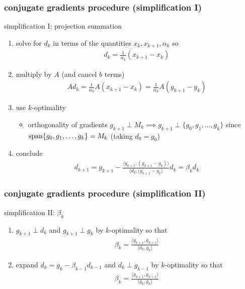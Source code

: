 \documentclass[10pt,dvipsnames*]{beamer}
\begin{document}
\begin{frame}
  \frametitle{conjugate gradients procedure (simplification I)}
  \begin{block}{simplification I: projection summation}
    \begin{enumerate}
      \item \pause solve for $d_k$ in terms of the quantities $x_k, x_{k+1}, \alpha_k$ so
      \begin{align}
        d_k = \frac{1}{\alpha_k} (x_{k+1} - x_k)
      \end{align}
      \item \pause multiply by $A$ (and cancel $b$ terms)
      \begin{align}
        A d_k = \frac{1}{\alpha_k} A (x_{k+1} - x_k) = \frac{1}{\alpha_k} A (g_{k+1} - g_k)
      \end{align}
      \item \pause use $k$-optimality
      \begin{itemize}
        \item orthogonality of gradients $g_{k+1} \perp M_k \implies g_{k+1} \perp \{ g_0, g_1, \ldots, g_{k} \}$ since $\operatorname{span} \{ g_0, g_1, \ldots, g_{k} \} = M_k$ (taking $d_0 = g_0$)
      \end{itemize}
      \item \pause conclude
      \begin{align}
        d_{k+1} = g_{k+1} - \frac{\langle g_{k+1}, (g_{k+1} - g_k) \rangle} {\langle d_k, (g_{k+1} - g_k \rangle} d_k = \beta_k d_k
      \end{align}
    \end{enumerate}
  \end{block}
\end{frame}
%
\begin{frame}
  \frametitle{conjugate gradients procedure (simplification II)}
  \begin{block}{simplification II: $\beta_k$}
    \begin{enumerate}
      \item \pause $g_{k+1} \perp d_k$ and $g_{k+1} \perp g_k$ by $k$-optimality so that
      \begin{align}
        \beta_k = \frac{\langle g_{k+1}, g_{k+1} \rangle} {\langle d_k, g_k \rangle}
      \end{align}
      \item \pause expand $d_k = g_k - \beta_{k-1} d_{k-1}$ and $d_k \perp g_{k-1}$ by $k$-optimality so that
      \begin{align}
        \beta_k = \frac{\langle g_{k+1}, g_{k+1} \rangle} {\langle g_k, g_k \rangle}
      \end{align}
    \end{enumerate}
  \end{block}
\end{frame}
\end{document}
